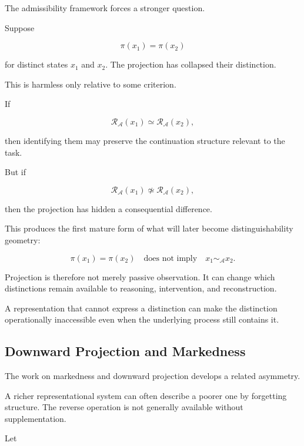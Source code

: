 \documentclass[11pt]{article}
\theoremstyle{remark}
\newcommand{\Adm}{\mathcal{A}}
\newcommand{\Reach}{\mathcal{R}}
\begin{document}
The admissibility framework forces a stronger question.

Suppose

\begin{equation}
\pi(x_1)=\pi(x_2)
\end{equation}

for distinct states $x_1$ and $x_2$. The projection has collapsed their distinction.

This is harmless only relative to some criterion.

If

\begin{equation}
\Reach_{\Adm}(x_1)
\simeq
\Reach_{\Adm}(x_2),
\end{equation}

then identifying them may preserve the continuation structure relevant to the task.

But if

\begin{equation}
\Reach_{\Adm}(x_1)
\not\simeq
\Reach_{\Adm}(x_2),
\end{equation}

then the projection has hidden a consequential difference.

This produces the first mature form of what will later become distinguishability geometry:

\begin{equation}
\boxed{
\pi(x_1)=\pi(x_2)
\quad\text{does not imply}\quad
x_1\sim_{\Adm}x_2.
}
\end{equation}

Projection is therefore not merely passive observation. It can change which distinctions remain available to reasoning, intervention, and reconstruction.

A representation that cannot express a distinction can make the distinction operationally inaccessible even when the underlying process still contains it.

\subsection{Downward Projection and Markedness}

The work on markedness and downward projection develops a related asymmetry.

A richer representational system can often describe a poorer one by forgetting structure. The reverse operation is not generally available without supplementation.

Let
\end{document}
